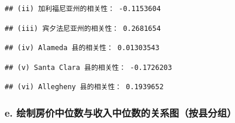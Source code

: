 \documentclass[
]{article}
\begin{document}
\begin{verbatim}
## (ii) 加利福尼亚州的相关性： -0.1153604
\end{verbatim}

\begin{verbatim}
## (iii) 宾夕法尼亚州的相关性： 0.2681654
\end{verbatim}

\begin{verbatim}
## (iv) Alameda 县的相关性： 0.01303543
\end{verbatim}

\begin{verbatim}
## (v) Santa Clara 县的相关性： -0.1726203
\end{verbatim}

\begin{verbatim}
## (vi) Allegheny 县的相关性： 0.1939652
\end{verbatim}

\subsubsection{e.
绘制房价中位数与收入中位数的关系图（按县分组）}\label{e.-ux7ed8ux5236ux623fux4ef7ux4e2dux4f4dux6570ux4e0eux6536ux5165ux4e2dux4f4dux6570ux7684ux5173ux7cfbux56feux6309ux53bfux5206ux7ec4}
\end{document}
